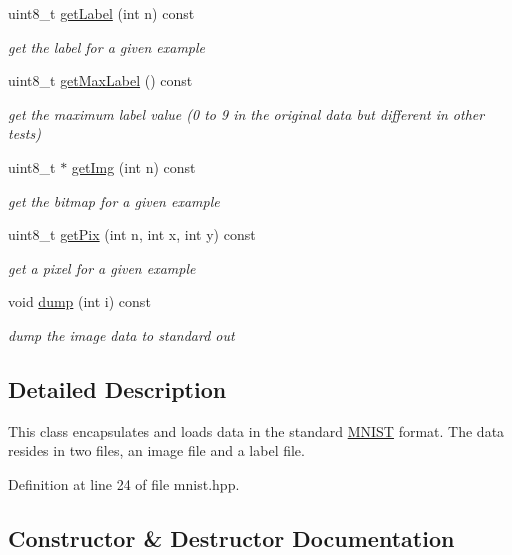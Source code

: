 \begin{DoxyCompactItemize}
uint8\+\_\+t \hyperlink{classMNIST_aff0f1f4328e8fe5b34f2f00d358eb49d}{get\+Label} (int n) const 
\begin{DoxyCompactList}\small\item\em get the label for a given example \end{DoxyCompactList}\item 
uint8\+\_\+t \hyperlink{classMNIST_a0e4ae7fe6a3096dc5c3a630263557961}{get\+Max\+Label} () const 
\begin{DoxyCompactList}\small\item\em get the maximum label value (0 to 9 in the original data but different in other tests) \end{DoxyCompactList}\item 
uint8\+\_\+t $\ast$ \hyperlink{classMNIST_ac328b08d95f5d62397e413ad0ae09558}{get\+Img} (int n) const 
\begin{DoxyCompactList}\small\item\em get the bitmap for a given example \end{DoxyCompactList}\item 
uint8\+\_\+t \hyperlink{classMNIST_a2ceee96654593e42a5f39e972116b735}{get\+Pix} (int n, int x, int y) const 
\begin{DoxyCompactList}\small\item\em get a pixel for a given example \end{DoxyCompactList}\item 
void \hyperlink{classMNIST_a0e940301d9f253a99282caea60e5c61a}{dump} (int i) const 
\begin{DoxyCompactList}\small\item\em dump the image data to standard out \end{DoxyCompactList}\end{DoxyCompactItemize}


\subsection{Detailed Description}
This class encapsulates and loads data in the standard \hyperlink{classMNIST}{M\+N\+I\+ST} format. The data resides in two files, an image file and a label file. 

Definition at line 24 of file mnist.\+hpp.



\subsection{Constructor \& Destructor Documentation}
